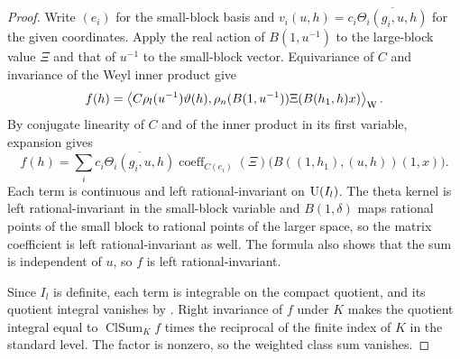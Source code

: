 \begin{proof}
Write $(e_i)$ for the small-block basis and $v_i(u,h)=c_i\overline{\Theta_i(g_i,u,h)}$ for the given coordinates. Apply the real action of $B(1,u^{-1})$ to the large-block value $\Xi$ and that of $u^{-1}$ to the small-block vector. Equivariance of $C$ and invariance of the Weyl inner product give
\[
 f(h)=\left\langle
   C\rho_l(u^{-1})\vartheta(h),
   \rho_n(B(1,u^{-1}))\Xi(B(h_1,h)x)
 \right\rangle_{\rm W}.
\]
By conjugate linearity of $C$ and of the inner product in its first variable, expansion gives
\[
 f(h)=\sum_i c_i\overline{\Theta_i(g_i,u,h)}
       \operatorname{coeff}_{C(e_i)}(\Xi)
          \bigl(B((1,h_1),(u,h))(1,x)\bigr).
\]
Each term is continuous and left rational-invariant on $\operatorname{U}(I_l)$. The theta kernel is left rational-invariant in the small-block variable and $B(1,\delta)$ maps rational points of the small block to rational points of the larger space, so the matrix coefficient is left rational-invariant as well. The formula also shows that the sum is independent of $u$, so $f$ is left rational-invariant.

Since $I_l$ is definite, each term is integrable on the compact quotient, and its quotient integral vanishes by . Right invariance of $f$ under $K$ makes the quotient integral equal to $\operatorname{ClSum}_K f$ times the reciprocal of the finite index of $K$ in the standard level. The factor is nonzero, so the weighted class sum vanishes.
\end{proof}


